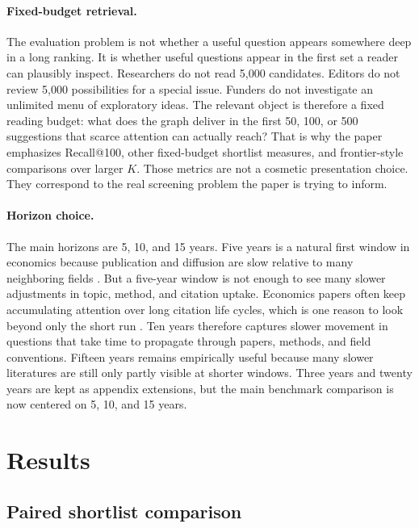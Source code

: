 \documentclass[11pt]{article}
\begin{document}
\paragraph{Fixed-budget retrieval.} The evaluation problem is not whether a useful question appears somewhere deep in a long ranking. It is whether useful questions appear in the first set a reader can plausibly inspect. Researchers do not read 5{,}000 candidates. Editors do not review 5{,}000 possibilities for a special issue. Funders do not investigate an unlimited menu of exploratory ideas. The relevant object is therefore a fixed reading budget: what does the graph deliver in the first 50, 100, or 500 suggestions that scarce attention can actually reach? That is why the paper emphasizes Recall@100, other fixed-budget shortlist measures, and frontier-style comparisons over larger \(K\). Those metrics are not a cosmetic presentation choice. They correspond to the real screening problem the paper is trying to inform.

\paragraph{Horizon choice.} The main horizons are 5, 10, and 15 years. Five years is a natural first window in economics because publication and diffusion are slow relative to many neighboring fields \citep{hadavand2024publishing}. But a five-year window is not enough to see many slower adjustments in topic, method, and citation uptake. Economics papers often keep accumulating attention over long citation life cycles, which is one reason to look beyond only the short run \citep{hamermesh2018citations}. Ten years therefore captures slower movement in questions that take time to propagate through papers, methods, and field conventions. Fifteen years remains empirically useful because many slower literatures are still only partly visible at shorter windows. Three years and twenty years are kept as appendix extensions, but the main benchmark comparison is now centered on 5, 10, and 15 years.

\section{Results}
\label{sec:results}

\subsection{Paired shortlist comparison}
\end{document}
